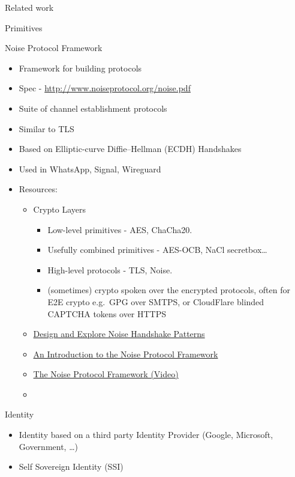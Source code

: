 \begin{frame}[fragile]{Related work}
\begin{block}{Primitives}
\begin{block}{Noise Protocol Framework}
\protect\hypertarget{noise-protocol-framework}{}
\begin{itemize}
\tightlist
\item
  Framework for building protocols
\item
  Spec - \url{http://www.noiseprotocol.org/noise.pdf}
\item
  Suite of channel establishment protocols
\item
  Similar to TLS
\item
  Based on Elliptic-curve Diffie--Hellman (ECDH) Handshakes
\item
  Used in WhatsApp, Signal, Wireguard
\item
  Resources:

  \begin{itemize}
  \tightlist
  \item
    Crypto Layers

    \begin{itemize}
    \tightlist
    \item
      Low-level primitives - AES, ChaCha20.
    \item
      Usefully combined primitives - AES-OCB, NaCl secretbox\ldots{}
    \item
      High-level protocols - TLS, Noise.
    \item
      (sometimes) crypto spoken over the encrypted protocols, often for
      E2E crypto e.g.~GPG over SMTPS, or CloudFlare blinded CAPTCHA
      tokens over HTTPS
    \end{itemize}
  \item
    \href{https://noiseexplorer.com/}{Design and Explore Noise Handshake
    Patterns}
  \item
    \href{https://duo.com/labs/tech-notes/noise-protocol-framework-intro}{An
    Introduction to the Noise Protocol Framework}
  \item
    \href{https://www.youtube.com/watch?v=ceGTgqypwnQ}{The Noise
    Protocol Framework (Video)}
  \item
  \end{itemize}
\end{itemize}
\end{block}

\begin{block}{Identity}
\protect\hypertarget{identity}{}
\begin{itemize}
\tightlist
\item
  Identity based on a third party Identity Provider (Google, Microsoft,
  Government, \ldots)
\item
  Self Sovereign Identity (SSI)
\end{itemize}
\end{block}
\end{block}


\end{frame}
